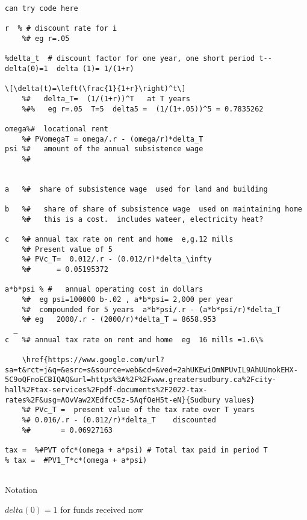 \begin{verbatim}
can try code here

r  % # discount rate for i
    %# eg r=.05

%delta_t  # discount factor for one year, one short period t-- delta(0)=1  delta (1)= 1/(1+r) 

\[\delta(t)=\left(\frac{1}{1+r}\right)^t\]
    %#   delta_T=  (1/(1+r))^T   at T years
    %#%   eg r=.05  T=5  delta5 =  (1/(1+.05))^5 = 0.7835262

omega%#  locational rent
    %# PVomegaT = omega/.r - (omega/r)*delta_T
psi %#   amount of the annual subsistence wage
    %#


a   %#  share of subsistence wage  used for land and building

b   %#   share of share of subsistence wage  used on maintaining home
    %#   this is a cost.  includes wateer, electricity heat?
  
c   %# annual tax rate on rent and home  e,g.12 mills
    %# Present value of 5
    %# PVc_T=  0.012/.r - (0.012/r)*delta_\infty
    %#      = 0.05195372

a*b*psi % #   annual operating cost in dollars  
    %#  eg psi=100000 b-.02 , a*b*psi= 2,000 per year 
    %#  compounded for 5 years  a*b*psi/.r - (a*b*psi/r)*delta_T
    %# eg   2000/.r - (2000/r)*delta_T = 8658.953
  _
c   %# annual tax rate on rent and home  eg  16 mills =1.6\%
    
    \href{https://www.google.com/url?sa=t&rct=j&q=&esrc=s&source=web&cd=&ved=2ahUKEwiOmNPUvIL9AhUUmokEHX-5C9oQFnoECBIQAQ&url=https%3A%2F%2Fwww.greatersudbury.ca%2Fcity-hall%2Ftax-services%2Fpdf-documents%2F2022-tax-rates%2F&usg=AOvVaw2XEdfcC5z-5AqfOeH5t-eN}{Sudbury values}
    %# PVc_T =  present value of the tax rate over T years
    %# 0.016/.r - (0.012/r)*delta_T    discounted
    %#       = 0.06927163

tax =  %#PVT ofc*(omega + a*psi) # Total tax paid in period T
% tax =  #PV1_T*c*(omega + a*psi)


\end{verbatim}

Notation

$delta(0)=1$  for funds received now

